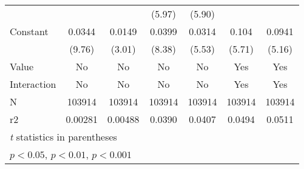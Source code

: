 {\begin{tabular}{l*{6}{c}}
                    &                     &                     &      (5.97)         &      (5.90)         &                     &                     \\
[1em]
Constant            &      0.0344\sym{***}&      0.0149\sym{**} &      0.0399\sym{***}&      0.0314\sym{***}&       0.104\sym{***}&      0.0941\sym{***}\\
                    &      (9.76)         &      (3.01)         &      (8.38)         &      (5.53)         &      (5.71)         &      (5.16)         \\
\hline
Value               &          No         &          No         &          No         &          No         &         Yes         &         Yes         \\
Interaction         &          No         &          No         &          No         &          No         &         Yes         &         Yes         \\
N                   &      103914         &      103914         &      103914         &      103914         &      103914         &      103914         \\
r2                  &     0.00281         &     0.00488         &      0.0390         &      0.0407         &      0.0494         &      0.0511         \\
\hline\hline
\multicolumn{7}{l}{\footnotesize \textit{t} statistics in parentheses}\\
\multicolumn{7}{l}{\footnotesize \sym{*} \(p<0.05\), \sym{**} \(p<0.01\), \sym{***} \(p<0.001\)}\\
\end{tabular}
}
